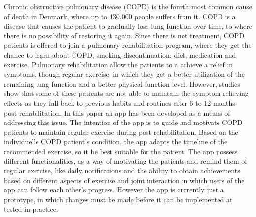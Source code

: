 Chronic obstructive pulmonary disease (COPD) is the fourth most common cause of death in Denmark, where up to 430,000 people suffers from it. 
COPD is a disease that causes the patient to gradually lose lung function over time, to where there is no possibility of restoring it again.
Since there is not treatment, COPD patients is offered to join a pulmonary rehabilitation program, where they get the chance to learn about COPD, smoking discontinuation, diet, medication and exercise. 
Pulmonary rehabilitation allow the patients to a achieve a relief in symptoms, though regular exercise, in which they get a better utilization of the remaining lung function and a better physical function level. 
However, studies show that some of these patients are not able to maintain the symptom relieving effects as they fall back to previous habits and routines after 6 to 12 months post-rehabilitation. 
In this paper an app has been developed as a means of addressing this issue. The intention of the app is to guide and motivate COPD patients to maintain regular exercise during post-rehabilitation. 
Based on the individuelle COPD patient's condition, the app adapts the timeline of the recommended exercise, so it be best suitable for the patient. 
The app possess different functionalities, as a way of motivating the patients and remind them of regular exercise, like daily notifications and the ability to obtain achievements based on different aspects of exercise and joint interaction in which users of the app can follow each other's progress.
However the app is currently just a prototype, in which changes must be made before it can be implemented at tested in practice.